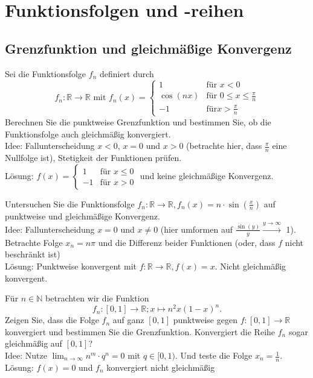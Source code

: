 \section{Funktionsfolgen und -reihen}
\subsection{Grenzfunktion und gleichmäßige Konvergenz}
Sei die Funktionsfolge $f_n$ definiert durch
\begin{displaymath}
  f_n : \mathbb{R} \to \mathbb{R} \text{ mit } f_n(x)=
  \begin{cases}
    1        & \text{für } x < 0\\
    \cos(nx) & \text{für } 0 \leq x \leq \frac{\pi}{n}\\
    -1       &\text{für} x > \frac{\pi}{n} 
  \end{cases}
\end{displaymath}
Berechnen Sie die punktweise Grenzfunktion und bestimmen Sie, ob die Funktionsfolge auch gleichmäßig konvergiert.\\
Idee: Fallunterscheidung $x < 0$, $x = 0$ und $x > 0$ (betrachte hier, dass $\frac{\pi}{n}$ eine Nullfolge ist), Stetigkeit der Funktionen prüfen.\\
Lösung: $f(x) = \begin{cases} 1 & \text{für } x \leq 0\\ -1 & \text{für } x > 0\end{cases}$ und keine gleichmäßige Konvergenz.

Untersuchen Sie die Funktionsfolge $f_n : \mathbb{R} \to \mathbb{R}, f_n(x) = n \cdot \sin\left(\frac{x}{n}\right)$ auf punktweise und gleichmäßige Konvergenz.\\
Idee: Fallunterscheidung $x = 0$ und $x \neq 0$ (hier umformen auf $\frac{\sin(y)}{y} \xrightarrow{y \to \infty}$ 1).
Betrachte Folge $x_n = n\pi$ und die Differenz beider Funktionen (oder, dass $f$ nicht beschränkt ist)\\
Lösung: Punktweise konvergent mit $f : \mathbb{R} \to \mathbb{R}, f(x) = x$. Nicht gleichmäßig konvergent.

Für $n \in \mathbb{N}$ betrachten wir die Funktion
\begin{displaymath}
  f_n: [0,1] \to \mathbb{R}; x \mapsto n^2x(1-x)^n.
\end{displaymath}
Zeigen Sie, dass die Folge $f_n$ auf ganz $[0,1]$ punktweise gegen $f : [0,1] \to \mathbb{R}$ konvergiert und bestimmen Sie die Grenzfunktion.
Konvergiert die Reihe $f_n$ sogar gleichmäßig auf $[0,1]$?\\
Idee: Nutze $\lim_{n \to \infty} n^m \cdot q^n = 0$ mit $q \in [0,1)$. Und teste die Folge $x_n = \frac{1}{n}$.\\
Lösung: $f(x) = 0$ und $f_n$ konvergiert nicht gleichmäßig


